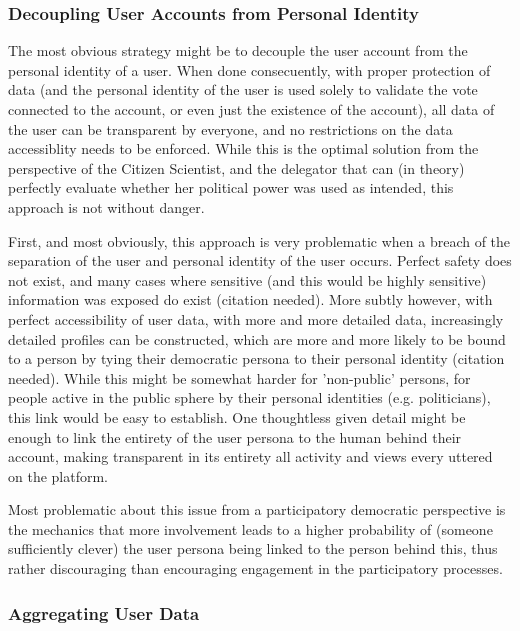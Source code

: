 \subsubsection{Decoupling User Accounts from Personal Identity}

The most obvious strategy might be to decouple the user account from the personal identity of a user. When done consecuently, with proper protection of data (and the personal identity of the user is used solely to validate the vote connected to the account, or even just the existence of the account), all data of the user can be transparent by everyone, and no restrictions on the data accessiblity needs to be enforced. While this is the optimal solution from the perspective of the Citizen Scientist, and the delegator that can (in theory) perfectly evaluate whether her political power was used as intended, this approach is not without danger.

First, and most obviously, this approach is very problematic when a breach of the separation of the user and personal identity of the user occurs. Perfect safety does not exist, and many cases where sensitive (and this would be highly sensitive) information was exposed do exist (citation needed). More subtly however, with perfect accessibility of user data, with more and more detailed data, increasingly detailed profiles can be constructed, which are more and more likely to be bound to a person by tying their democratic persona to their personal identity (citation needed). While this might be somewhat harder for 'non-public' persons, for people active in the public sphere by their personal identities (e.g. politicians), this link would be easy to establish. One thoughtless given detail might be enough to link the entirety of the user persona to the human behind their account, making transparent in its entirety all activity and views every uttered on the platform. 

Most problematic about this issue from a participatory democratic perspective is the mechanics that more involvement leads to a higher probability of (someone sufficiently clever) the user persona being linked to the person behind this, thus rather discouraging than encouraging engagement in the participatory processes.

\subsubsection{Aggregating User Data}

